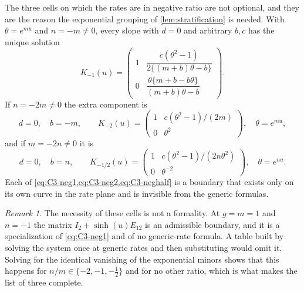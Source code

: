 \documentclass[11pt,reqno]{amsart}
\theoremstyle{plain}
\theoremstyle{definition}
\theoremstyle{remark}
\newtheorem{remark}[theorem]{Remark}
\numberwithin{equation}{section}
\newcommand{\Id}{I_2}
\begin{document}
The three cells on which the rates are in negative ratio are not optional, and
they are the reason the exponential grouping of \cref{lem:stratification} is
needed. With $\theta=e^{mu}$ and $n=-m\ne0$, every slope with $d=0$ and arbitrary
$b,c$ has the unique solution
\begin{equation}
K_{-1}(u)=\begin{pmatrix}
1&\dfrac{c(\theta^2-1)}{2\{(m+b)\theta-b\}}\\[2mm]
0&\dfrac{\theta\{m+b-b\theta\}}{(m+b)\theta-b}
\end{pmatrix}.                                      \label{eq:C3-neg1}
\end{equation}
If $n=-2m\ne0$ the extra component is
\begin{equation}
d=0,\quad b=-m,\qquad
K_{-2}(u)=\begin{pmatrix}1&c(\theta^2-1)/(2m)\\0&\theta^2\end{pmatrix},
\quad \theta=e^{mu},                                     \label{eq:C3-neg2}
\end{equation}
and if $m=-2n\ne0$ it is
\begin{equation}
d=0,\quad b=n,\qquad
K_{-1/2}(u)=\begin{pmatrix}1&c(\theta^2-1)/(2n\theta^2)\\0&\theta^{-2}\end{pmatrix},
\quad \theta=e^{nu}.                                     \label{eq:C3-neghalf}
\end{equation}
Each of \cref{eq:C3-neg1,eq:C3-neg2,eq:C3-neghalf} is a boundary that exists only
on its own curve in the rate plane and is invisible from the generic formulas.

\begin{remark}
\label{rem:C3-resonance}
The necessity of these cells is not a formality. At $g=m=1$ and $n=-1$ the matrix
$\Id+\sinh(u)E_{12}$ is an admissible boundary, and it is a specialization of
\cref{eq:C3-neg1} and of no generic-rate formula. A table built by solving the
system once at generic rates and then substituting would omit it. Solving for the
identical vanishing of the exponential minors shows that this happens for
$n/m\in\{-2,-1,-\tfrac12\}$ and for no other ratio, which is what makes the list
of three complete.
\end{remark}
\end{document}
